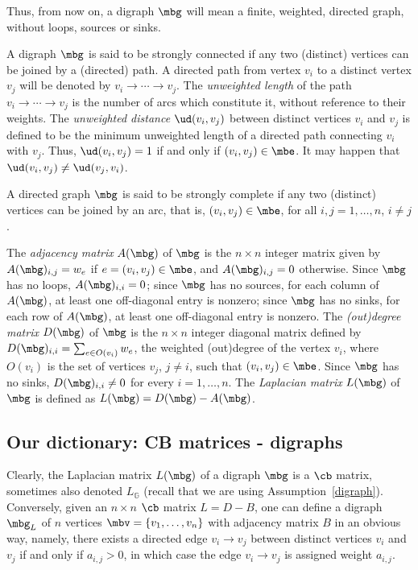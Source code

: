 \begin{assumption}\label{digraph}
Thus, from now on, a digraph $\mbg$ will mean a finite, weighted,
directed graph, without loops, sources or sinks.
\end{assumption}

A digraph $\mbg$ is said to be strongly connected if any two
(distinct) vertices can be joined by a (directed) path. A directed
path from vertex $v_i$ to a distinct vertex $v_j$ will be denoted by
$v_i\to\cdots\to v_j$. The {\em unweighted length} of the path
$v_i\to\cdots\to v_j$ is the number of arcs which constitute it,
without reference to their weights.  The {\em unweighted distance}
$\ud(v_i,v_j)$ between distinct vertices $v_i$ and $v_j$ is defined to
be the minimum unweighted length of a directed path connecting $v_i$
with $v_j$. Thus, $\ud(v_i,v_j)=1$ if and only if $(v_i,v_j)\in\mbe$.
It may happen that $\ud(v_i,v_j)\neq \ud(v_j,v_i)$.

A directed graph $\mbg$ is said to be strongly complete if any two
(distinct) vertices can be joined by an arc, that is, $(v_i,v_j)\in
\mbe$, for all $i,j=1,\ldots ,n$, $i\neq j$.

The {\em adjacency matrix} $A(\mbg)$ of $\mbg$ is the $n\times n$
integer matrix given by $A(\mbg)_{i,j}=w_e$ if $e=(v_i,v_j)\in \mbe$,
and $A(\mbg)_{i,j}=0$ otherwise. Since $\mbg$ has no loops,
$A(\mbg)_{i,i}=0$; since $\mbg$ has no sources, for each column of
$A(\mbg)$, at least one off-diagonal entry is nonzero; since $\mbg$
has no sinks, for each row of $A(\mbg)$, at least one off-diagonal
entry is nonzero. The {\em (out)degree matrix} $D(\mbg)$ of $\mbg$ is
the $n\times n$ integer diagonal matrix defined by
$D(\mbg)_{i,i}=\sum_{e\in O(v_i)}w_e$, the weighted (out)degree of the
vertex $v_i$, where $O(v_i)$ is the set of vertices $v_j$, $j\neq i$,
such that $(v_i,v_j)\in \mbe$. Since $\mbg$ has no sinks,
$D(\mbg)_{i,i}\neq 0$ for every $i=1,\ldots, n$. The {\em Laplacian
  matrix} $L(\mbg)$ of $\mbg$ is defined as $L(\mbg)=D(\mbg)-A(\mbg)$.

\subsection{Our dictionary: CB matrices - digraphs}\label{dictionary}

Clearly, the Laplacian matrix $L(\mbg)$ of a digraph $\mbg$
is a $\cb$ matrix, sometimes also denoted $L_{\mathbb{G}}$ (recall
that we are using Assumption~\ref{digraph}). Conversely, given an
$n\times n$ $\cb$ matrix $L=D-B$, one can define a digraph $\mbg_L$ of
$n$ vertices $\mbv=\{v_1,\ldots ,v_n\}$ with adjacency matrix $B$ in
an obvious way, namely, there exists a directed edge $v_i\to v_j$
between distinct vertices $v_i$ and $v_j$ if and only if $a_{i,j}>0$,
in which case the edge $v_i\to v_j$ is assigned weight $a_{i,j}$.

